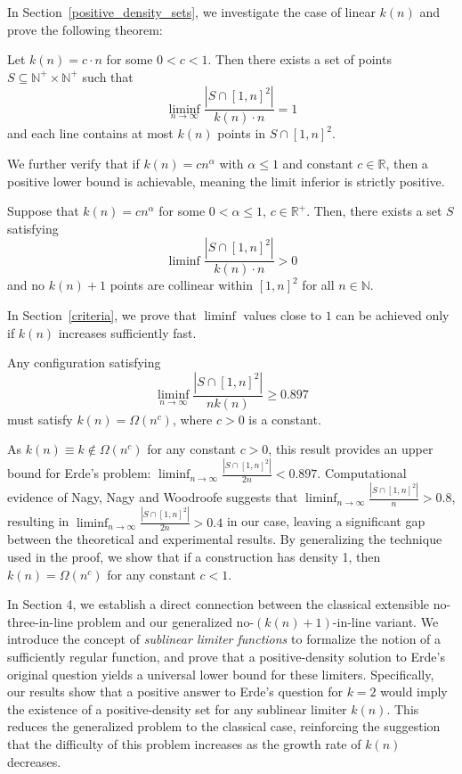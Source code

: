 \documentclass[11pt,a4paper]{article}
\numberwithin{equation}{section}
\newcommand{\nn}{\mathbb{N}}
\begin{document}
In Section~\ref{positive_density_sets}, we investigate the case of linear $k(n)$ and prove the following theorem:

\begin{theorem} \label{bigtheorem_linear}
    Let $k(n) = c\cdot n$ for some $0<c<1$. Then there exists a set of points $S\subseteq\nn^+\times \nn^+$ such that
    $$\displaystyle\liminf_{n\to\infty} \frac{|S\cap [1,n]^2|}{k(n)\cdot n} = 1$$ 
    and each line contains at most $k(n)$ points in $S\cap [1, n]^2$.
\end{theorem}

We further verify that if $k(n) = cn^{\alpha}$ with $\alpha \le 1$ and constant $c\in\mathbb{R}$, then a positive lower bound is achievable, meaning the limit inferior is strictly positive.

\begin{theorem} \label{posliminf_linear}
    Suppose that $k(n) = cn^\alpha$ for some $0<\alpha\le1$, $c\in \mathbb{R^+}$. Then, there exists a set $S$ satisfying $$\liminf \frac{|S\cap [1,n]^2|}{k(n)\cdot n} > 0$$
    and no $k(n)+1$ points are collinear within $[1,n]^2$ for all $n\in \nn$.
\end{theorem}


\medskip

In Section~\ref{criteria}, we prove that $\liminf$ values close to $1$ can be achieved only if $k(n)$ increases sufficiently fast.
\begin{theorem}
    Any configuration satisfying $$\displaystyle\liminf_{n\to\infty}\frac{\left|S\cap[1,n]^{2}\right|}{n k(n)} \ge 0.897$$ must satisfy $k(n) = \Omega( n^c)$, where $c>0$ is a constant.
\end{theorem}
 
  As $k(n)\equiv k \notin \Omega( n^c)$ for any constant $c>0$, this result provides an upper bound for Erde's problem: $\displaystyle\liminf_{n\to \infty}\frac{\left|S\cap[1,n]^{2}\right|}{2n}<0.897$.  Computational evidence of Nagy, Nagy and Woodroofe suggests that $\displaystyle\liminf_{n\to \infty}\frac{\left|S\cap[1,n]^{2}\right|}{n}>0.8$, resulting in $\displaystyle\liminf_{n\to \infty}\frac{\left|S\cap[1,n]^{2}\right|}{2n}>0.4$ in our case, leaving a significant gap between the theoretical and experimental results. By generalizing the technique used in the proof, we show that if a construction has density 1, then $k(n)=\Omega(n^c)$ for any constant $c<1$.

In Section 4, we establish a direct connection between the classical extensible no-three-in-line problem and our generalized no-$(k(n)+1)$-in-line variant. We introduce the concept of \textit{sublinear limiter functions} to formalize the notion of a sufficiently regular function, and prove that a positive-density solution to Erde's original question yields a universal lower bound for these limiters. Specifically, our results show that a positive answer to Erde's question for $k=2$ would imply the existence of a positive-density set for any sublinear limiter $k(n)$. This reduces the generalized problem to the classical case, reinforcing the suggestion that the difficulty of this problem increases as the growth rate of $k(n)$ decreases.
\end{document}
